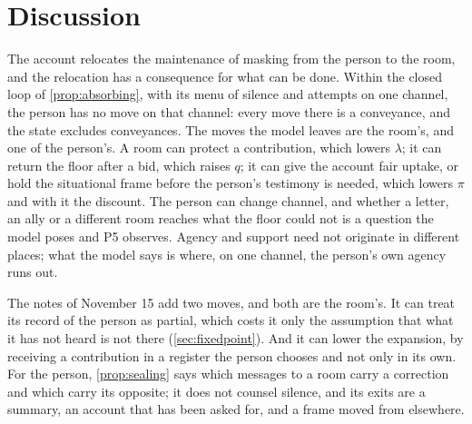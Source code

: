 \section{Discussion}\label{sec:discussion}

The account relocates the maintenance of masking from the person to the room, and the relocation has a consequence for what can be done. Within the closed loop of \autoref{prop:absorbing}, with its menu of silence and attempts on one channel, the person has no move on that channel: every move there is a conveyance, and the state excludes conveyances. The moves the model leaves are the room's, and one of the person's. A room can protect a contribution, which lowers $\lambda$; it can return the floor after a bid, which raises $q$; it can give the account fair uptake, or hold the situational frame before the person's testimony is needed, which lowers $\pi$ and with it the discount. The person can change channel, and whether a letter, an ally or a different room reaches what the floor could not is a question the model poses and P5 observes. Agency and support need not originate in different places; what the model says is where, on one channel, the person's own agency runs out.

The notes of November 15 add two moves, and both are the room's. It can treat its record of the person as partial, which costs it only the assumption that what it has not heard is not there (\autoref{sec:fixedpoint}). And it can lower the expansion, by receiving a contribution in a register the person chooses and not only in its own.
For the person, \autoref{prop:sealing} says which messages to a room carry a correction and which carry its opposite; it does not counsel silence, and its exits are a summary, an account that has been asked for, and a frame moved from elsewhere.


